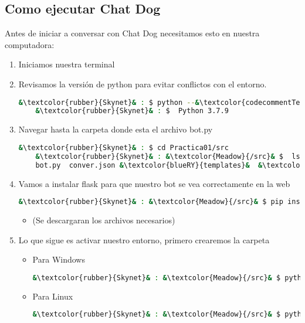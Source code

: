 \documentclass[a4paper,12pt]{article}
\begin{document}
\subsection{Como ejecutar Chat Dog}

Antes de iniciar a conversar con Chat Dog necesitamos esto en nuestra computadora:
\begin{enumerate}
    \item Iniciamos nuestra terminal
    \item Revisamos la versión de python para evitar conflictos con el entorno.
\begin{lstlisting}[language=bash]
    &\textcolor{rubber}{Skynet}& : $ python --&\textcolor{codecommentTerminal}{version}&
    &\textcolor{rubber}{Skynet}& : $  Python 3.7.9    
\end{lstlisting}

\item Navegar hasta la carpeta donde esta el archivo bot.py    
\begin{lstlisting}[language=bash]
    &\textcolor{rubber}{Skynet}& : $ cd Practica01/src
    &\textcolor{rubber}{Skynet}& : &\textcolor{Meadow}{/src}& $  ls 
    bot.py  conver.json &\textcolor{blueRY}{templates}&  &\textcolor{blueRY}{nenv}&
\end{lstlisting}

\item Vamos a instalar flask para que nuestro bot se vea correctamente en la web
\begin{lstlisting}[language=bash]    
    &\textcolor{rubber}{Skynet}& : &\textcolor{Meadow}{/src}& $ pip install flask
\end{lstlisting}
\begin{itemize}
    \item (Se descargaran los archivos necesarios)
\end{itemize}

\item Lo que sigue es activar nuestro entorno, primero crearemos la carpeta 
\begin{itemize}
    \item Para Windows
\begin{lstlisting}[language=bash]    
    &\textcolor{rubber}{Skynet}& : &\textcolor{Meadow}{/src}& $ python -m venv venv    
\end{lstlisting}
    \item Para Linux
\begin{lstlisting}[language=bash]    
    &\textcolor{rubber}{Skynet}& : &\textcolor{Meadow}{/src}& $ python -m venv venv    
\end{lstlisting}
\end{itemize}


\end{enumerate}
\end{document}
